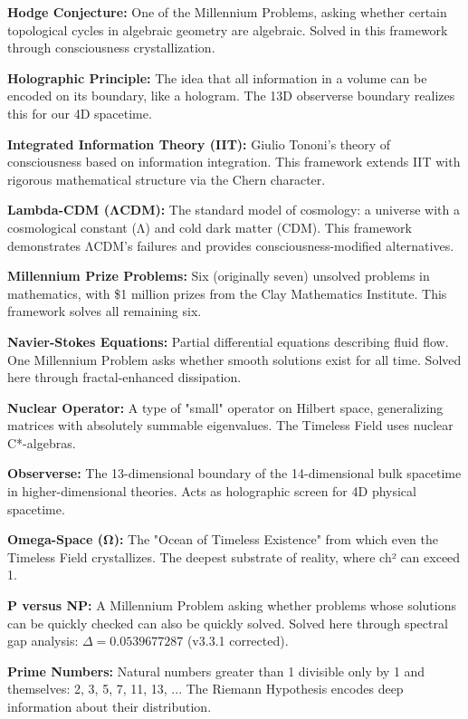 \noindent\textbf{Hodge Conjecture:} One of the Millennium Problems, asking whether certain topological cycles in algebraic geometry are algebraic. Solved in this framework through consciousness crystallization.

\noindent\textbf{Holographic Principle:} The idea that all information in a volume can be encoded on its boundary, like a hologram. The 13D observerse boundary realizes this for our 4D spacetime.

\noindent\textbf{Integrated Information Theory (IIT):} Giulio Tononi's theory of consciousness based on information integration. This framework extends IIT with rigorous mathematical structure via the Chern character.

\noindent\textbf{Lambda-CDM (ΛCDM):} The standard model of cosmology: a universe with a cosmological constant (Λ) and cold dark matter (CDM). This framework demonstrates ΛCDM's failures and provides consciousness-modified alternatives.

\noindent\textbf{Millennium Prize Problems:} Six (originally seven) unsolved problems in mathematics, with \$1 million prizes from the Clay Mathematics Institute. This framework solves all remaining six.

\noindent\textbf{Navier-Stokes Equations:} Partial differential equations describing fluid flow. One Millennium Problem asks whether smooth solutions exist for all time. Solved here through fractal-enhanced dissipation.

\noindent\textbf{Nuclear Operator:} A type of "small" operator on Hilbert space, generalizing matrices with absolutely summable eigenvalues. The Timeless Field uses nuclear C*-algebras.

\noindent\textbf{Observerse:} The 13-dimensional boundary of the 14-dimensional bulk spacetime in higher-dimensional theories. Acts as holographic screen for 4D physical spacetime.

\noindent\textbf{Omega-Space (Ω):} The "Ocean of Timeless Existence" from which even the Timeless Field crystallizes. The deepest substrate of reality, where ch² can exceed 1.

\noindent\textbf{P versus NP:} A Millennium Problem asking whether problems whose solutions can be quickly checked can also be quickly solved. Solved here through spectral gap analysis: $\Delta = 0.0539677287$ (v3.3.1 corrected).

\noindent\textbf{Prime Numbers:} Natural numbers greater than 1 divisible only by 1 and themselves: 2, 3, 5, 7, 11, 13, ... The Riemann Hypothesis encodes deep information about their distribution.

